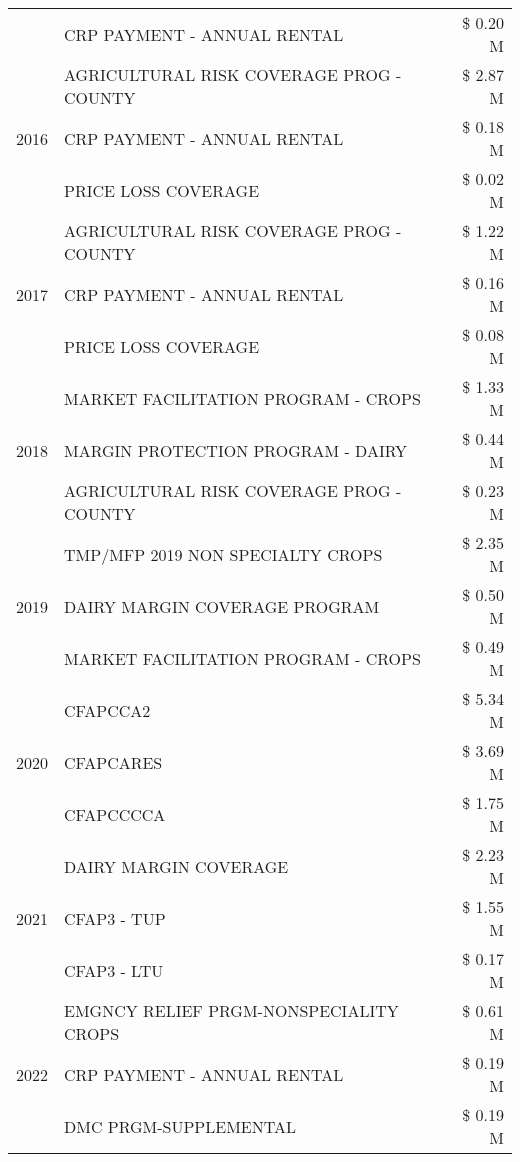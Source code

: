 \begin{tabular}{llr}
 & CRP PAYMENT - ANNUAL RENTAL & \$ 0.20 M \\
\cline{1-3}
\multirow[t]{3}{*}{2016} & AGRICULTURAL RISK COVERAGE PROG - COUNTY & \$ 2.87 M \\
 & CRP PAYMENT - ANNUAL RENTAL & \$ 0.18 M \\
 & PRICE LOSS COVERAGE & \$ 0.02 M \\
\cline{1-3}
\multirow[t]{3}{*}{2017} & AGRICULTURAL RISK COVERAGE PROG - COUNTY & \$ 1.22 M \\
 & CRP PAYMENT - ANNUAL RENTAL & \$ 0.16 M \\
 & PRICE LOSS COVERAGE & \$ 0.08 M \\
\cline{1-3}
\multirow[t]{3}{*}{2018} & MARKET FACILITATION PROGRAM - CROPS & \$ 1.33 M \\
 & MARGIN PROTECTION PROGRAM - DAIRY & \$ 0.44 M \\
 & AGRICULTURAL RISK COVERAGE PROG - COUNTY & \$ 0.23 M \\
\cline{1-3}
\multirow[t]{3}{*}{2019} & TMP/MFP 2019 NON SPECIALTY CROPS & \$ 2.35 M \\
 & DAIRY MARGIN COVERAGE PROGRAM & \$ 0.50 M \\
 & MARKET FACILITATION PROGRAM - CROPS & \$ 0.49 M \\
\cline{1-3}
\multirow[t]{3}{*}{2020} & CFAPCCA2 & \$ 5.34 M \\
 & CFAPCARES & \$ 3.69 M \\
 & CFAPCCCCA & \$ 1.75 M \\
\cline{1-3}
\multirow[t]{3}{*}{2021} & DAIRY MARGIN COVERAGE & \$ 2.23 M \\
 & CFAP3 - TUP & \$ 1.55 M \\
 & CFAP3 - LTU & \$ 0.17 M \\
\cline{1-3}
\multirow[t]{3}{*}{2022} & EMGNCY RELIEF PRGM-NONSPECIALITY CROPS & \$ 0.61 M \\
 & CRP PAYMENT - ANNUAL RENTAL & \$ 0.19 M \\
 & DMC PRGM-SUPPLEMENTAL & \$ 0.19 M \\
\cline{1-3}
\bottomrule
\end{tabular}
